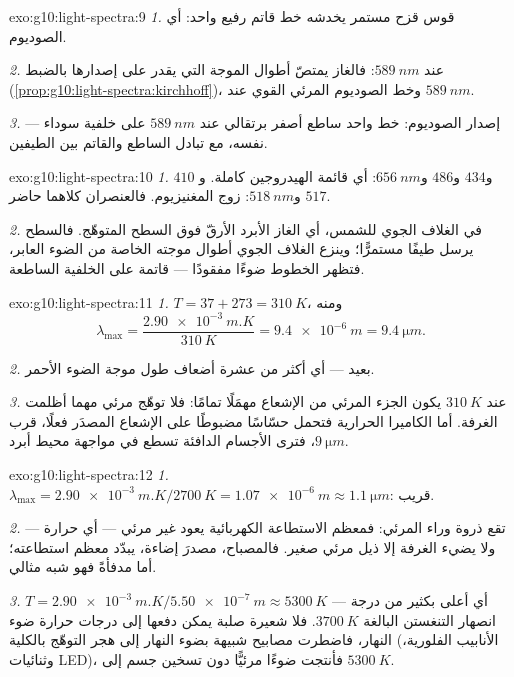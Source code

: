 \begin{solution}{exo:g10:light-spectra:9}
\emph{1.} قوس قزح مستمر يخدشه خط قاتم رفيع واحد: أي
 الصوديوم.

\emph{2.} عند $\qty{589}{nm}$: فالغاز يمتصّ أطوال الموجة التي يقدر
على إصدارها بالضبط (\cref{prop:g10:light-spectra:kirchhoff})، وخط الصوديوم
المرئي القوي عند $\qty{589}{nm}$.

\emph{3.}  إصدار الصوديوم: خط واحد ساطع أصفر برتقالي
عند $\qty{589}{nm}$ على خلفية سوداء ---  نفسه،
مع تبادل الساطع والقاتم بين الطيفين.
\end{solution}

\begin{solution}{exo:g10:light-spectra:10}
\emph{1.} $410$ و$434$ و$486$ و$\qty{656}{nm}$: أي قائمة الهيدروجين
كاملة. و$517$ و$\qty{518}{nm}$: زوج المغنيزيوم. فالعنصران كلاهما
حاضر.

\emph{2.} في الغلاف الجوي للشمس، أي الغاز الأبرد الأرقّ فوق
السطح المتوهّج. فالسطح يرسل طيفًا مستمرًّا؛ وينزع
الغلاف الجوي أطوال موجته الخاصة من الضوء العابر، فتظهر
الخطوط ضوءًا مفقودًا --- قاتمة على الخلفية الساطعة.
\end{solution}

\begin{solution}{exo:g10:light-spectra:11}
\emph{1.} $T = 37 + 273 = \qty{310}{K}$، ومنه
\[
\lambda_{\max} = \frac{\qty{2.90e-3}{m.K}}{\qty{310}{K}}
= \qty{9.4e-6}{m} = \qty{9.4}{\micro m}.
\]

\emph{2.}  بعيد --- أي أكثر من عشرة أضعاف طول موجة الضوء
الأحمر.

\emph{3.} عند $\qty{310}{K}$ يكون الجزء المرئي من الإشعاع
مهمَلًا تمامًا: فلا توهّج مرئي مهما أظلمت الغرفة. أما الكاميرا
الحرارية فتحمل حسّاسًا مضبوطًا على الإشعاع المصدَر فعلًا، قرب
$\qty{9}{\micro m}$، فترى الأجسام الدافئة تسطع في مواجهة محيط
أبرد.
\end{solution}

\begin{solution}{exo:g10:light-spectra:12}
\emph{1.} $\lambda_{\max} = \qty{2.90e-3}{m.K} / \qty{2700}{K}
= \qty{1.07e-6}{m} \approx \qty{1.1}{\micro m}$:  قريب.

\emph{2.} تقع ذروة  وراء المرئي: فمعظم الاستطاعة
الكهربائية يعود  غير مرئي --- أي حرارة --- ولا يضيء الغرفة
إلا ذيل مرئي صغير. فالمصباح، مصدرَ إضاءة، يبدّد معظم
استطاعته؛ أما مدفأةً فهو شبه مثالي.

\emph{3.} $T = \qty{2.90e-3}{m.K} / \qty{5.50e-7}{m} \approx
\qty{5300}{K}$ --- أي أعلى بكثير من درجة انصهار التنغستن البالغة
$\qty{3700}{K}$. فلا شعيرة صلبة يمكن دفعها إلى درجات حرارة
ضوء النهار، فاضطرت مصابيح شبيهة بضوء النهار إلى هجر التوهّج
بالكلية (الأنابيب الفلورية، وثنائيات LED)، فأنتجت ضوءًا مرئيًّا دون
تسخين جسم إلى $\qty{5300}{K}$.
\end{solution}

